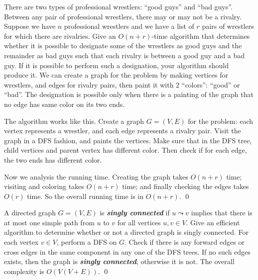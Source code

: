 

There are two types of professional wrestlers: ``good guys'' and ``bad guys''. Between any pair of professional wrestlers, there may or may not be a rivalry. Suppose we have $n$
professional wrestlers and we have a list of $r$ pairs of wrestlers for which there are rivalries. Give an $O(n + r)$-time algorithm that determines whether it is possible to designate
some of the wrestlers as good guys and the remainder as bad guys such that each rivalry is between a good guy and a bad guy. If it is possible to perform such a designation, your
algorithm should produce it.
\answer
We can create a graph for the problem by making vertices for wrestlers, and edges for rivalry pairs, then paint it with 2 ``colors'': ``good'' or ``bad''.
The designation is possible only when there is a painting of the graph that no edge has same color on its two ends.

The algorithm works like this. Create a graph $G=(V, E)$ for the problem: each vertex represents a wrestler, and each edge represents a rivalry pair.
Visit the graph in a DFS fashion, and paints the vertices. Make sure that in the DFS tree, child vertices and parent vertex has different color.
Then check if for each edge, the two ends has different color.

Now we analysis the running time. Creating the graph takes $O(n + r)$ time; visiting and coloring takes $O(n + r)$ time; and finally checking the edges takes $O(r)$ time. So the
overall running time is in $O(n + r)$.
\qed

A directed graph $G=(V, E)$ is \textsl{\textbf{singly connected}} if $u \leadsto v$ implies that there is at most one simple path from $u$ to $v$ for all vertices $u, v \in V$.
Give an efficient algorithm to determine whether or not a directed graph is singly connected.
\answer
For each vertex $v\in V$, perform a DFS on $G$. Check if there is any forward edges or cross edges in the same component in any one of the DFS trees. If no such edges exists, then the
graph is \textbf{\textsl{singly connected}}, otherwise it is not. The overall complexity is $O(V(V+E))$.
\qed

